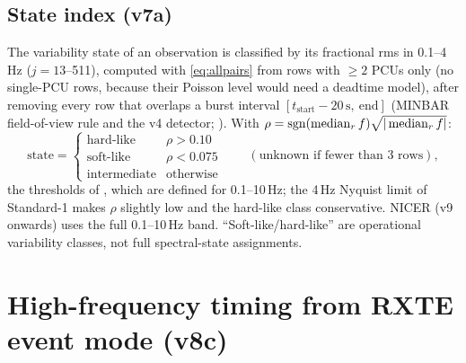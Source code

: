 \subsection{State index (v7a)}\label{sec:state}
The variability state of an observation is classified by its fractional rms in 0.1--4\,Hz ($j=13$--511), computed with
\cref{eq:allpairs} from rows with $\ge2$ PCUs only (no single-PCU rows, because their Poisson level would need a deadtime
model), after removing every row that overlaps a burst interval $[t_\mathrm{start}-20\,\mathrm{s},\ \text{end}]$ (MINBAR
field-of-view rule and the v4 detector; ). With $\rho = \operatorname{sgn}(\operatorname{median}_r f)\sqrt{|\operatorname{median}_r f|}$:
\begin{equation}
\text{state} = \begin{cases}\text{hard-like} & \rho>0.10\\ \text{soft-like} & \rho<0.075\\ \text{intermediate} & \text{otherwise}\end{cases}
\qquad(\text{unknown if fewer than 3 rows}),\label{eq:state}
\end{equation}
the thresholds of \citet[Table 2]{RemillardMcClintock2006}, which are defined for 0.1--10\,Hz; the 4\,Hz Nyquist limit
of Standard-1 makes $\rho$ slightly low and the hard-like class conservative. NICER (v9 onwards) uses the full
0.1--10\,Hz band. ``Soft-like/hard-like'' are operational variability classes, not full spectral-state assignments.

\section{High-frequency timing from RXTE event mode (v8c)}\label{sec:eventmode}

